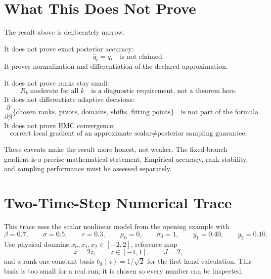 \documentclass[11pt]{article}
\numberwithin{equation}{section}
\begin{document}
\section{What This Does Not Prove}

The result above is deliberately narrow.

It does not prove exact posterior accuracy:
\begin{equation}
    \widehat q_t=q_t
    \quad\text{is not claimed.}
    \label{eq:p24-p19-90}
\end{equation}
It proves normalization and differentiation of the declared approximation.

It does not prove ranks stay small:
\begin{equation}
    R_k\ \text{moderate for all }k
    \quad\text{is a diagnostic requirement, not a theorem here.}
    \label{eq:p24-p19-91}
\end{equation}
It does not differentiate adaptive decisions:
\begin{equation}
    \frac{\partial}{\partial\beta}
    \{\text{chosen ranks, pivots, domains, shifts, fitting points}\}
    \quad\text{is not part of the formula.}
    \label{eq:p24-p19-92}
\end{equation}
It does not prove HMC convergence:
\begin{equation}
    \text{correct local gradient of an approximate scalar}
    \ne
    \text{posterior sampling guarantee.}
    \label{eq:p24-p19-93}
\end{equation}

These caveats make the result more honest, not weaker.  The fixed-branch
gradient is a precise mathematical statement.  Empirical accuracy, rank
stability, and sampling performance must be assessed separately.

\section{Two-Time-Step Numerical Trace}

This trace uses the scalar nonlinear model from the opening example with
\begin{equation}
    \beta=0.7,\qquad \sigma=0.5,\qquad r=0.3,\qquad
    \mu_0=0,\qquad \sigma_0=1,
    \qquad y_1=0.40,\qquad y_2=0.10.
    \label{eq:p24-trace-params}
\end{equation}
Use physical domains \(x_0,x_1,x_2\in[-2,2]\), reference map
\begin{equation}
    x=2z,\qquad z\in[-1,1],\qquad J=2,
    \label{eq:p24-trace-map}
\end{equation}
and a rank-one constant basis \(b_0(z)=1/\sqrt2\) for the first hand
calculation.  This basis is too small for a real run; it is chosen so every
number can be inspected.
\end{document}
